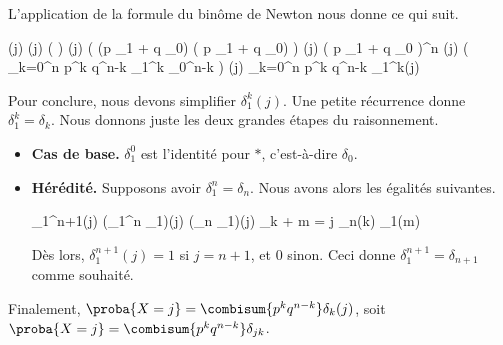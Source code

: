 L'application de la formule du binôme de Newton nous donne ce qui suit.

\begin{stepcalc}[style=sar]
\explnext{}
	\lawvar(j)
\explnext{}
	\lawvar[X_1 + \cdots + X_n](j)
	( \lawvar[X_1] \ast \cdots \ast \lawvar[X_n] ) (j)
\explnext{}
	\big( (p \delta_{1} + q \delta_{0}) \ast \cdots \ast ( p \delta_{1} + q \delta_{0}) \big) (j)
	( p \delta_{1} + q \delta_{0} )^n (j)
\explnext{}
	\big( \dsum_{k=0}^n \combi[n][k] p^k q^{n-k} \delta_{1}^k \ast \delta_{0}^{n-k} \big) (j)
\explnext{}
	\dsum_{k=0}^n \combi[n][k] p^k q^{n-k} \delta_{1}^k(j)
\end{stepcalc}


Pour conclure, nous devons simplifier $\delta_{1}^k(j)$. Une petite récurrence donne $\delta_{1}^k = \delta_k$. Nous donnons juste les deux grandes étapes du raisonnement.
%
\begin{itemize}
	\item \textbf{Cas de base.}
	 $\delta_{1}^0$ est l'identité pour $\ast$, c'est-à-dire $\delta_0$.


	\item \textbf{Hérédité.}
	Supposons avoir $\delta_{1}^n = \delta_n$. Nous avons alors les égalités suivantes.

	\begin{stepcalc}[style=sar]
		\delta_{1}^{n+1}(j)
	\explnext{}
		(\delta_{1}^{n} \ast \delta_{1})(j)
	\explnext{}
		(\delta_{n} \ast \delta_{1})(j)
	\explnext{}
		\dsum_{k + m = j} \delta_{n}(k) \delta_{1}(m)
	\end{stepcalc}
	
	Dès lors,
	$\delta_{1}^{n+1}(j) = 1$ si $j=n+1$, et $0$ sinon.
	Ceci donne $\delta_{1}^{n+1} = \delta_{n+1}$ comme souhaité.
\end{itemize}


Finalement,
$\proba{X = j} = \combisum{p^k q^{n-k}} \delta_{k}(j)$,
soit
$\proba{X = j} = \combisum{p^k q^{n-k}} \delta_{jk}$.